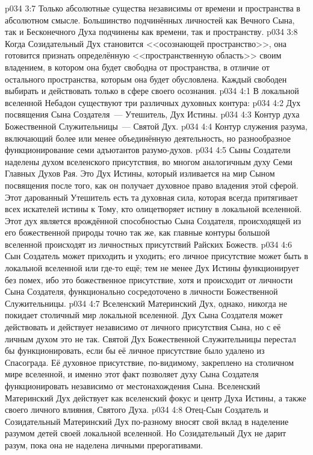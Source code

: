 \vs p034 3:7 \pc Только абсолютные существа независимы от времени и пространства в абсолютном смысле. Большинство подчинённых личностей как Вечного Сына, так и Бесконечного Духа подчинены как времени, так и пространству.
\vs p034 3:8 Когда Созидательный Дух становится <<осознающей пространство>>, она готовится признать определённую <<пространственную область>> своим владением, в котором она будет свободна от пространства, в отличие от остального пространства, которым она будет обусловлена. Каждый свободен выбирать и действовать только в сфере своего осознания.
\vs p034 4:1 В локальной вселенной Небадон существуют три различных духовных контура:
\vs p034 4:2 Дух посвящения Сына Создателя~--- Утешитель, Дух Истины.
\vs p034 4:3 Контур духа Божественной Служительницы~--- Святой Дух.
\vs p034 4:4 Контур служения разума, включающий более или менее объединённую деятельность, но разнообразное функционирование семи адъютантов разумо\hyp{}духов.
\vs p034 4:5 \pc Сыны Создатели наделены духом вселенского присутствия, во многом аналогичным духу Семи Главных Духов Рая. Это Дух Истины, который изливается на мир Сыном посвящения после того, как он получает духовное право владения этой сферой. Этот дарованный Утешитель есть та духовная сила, которая всегда притягивает всех искателей истины к Тому, кто олицетворяет истину в локальной вселенной. Этот дух является врождённой способностью Сына Создателя, происходящей из его божественной природы точно так же, как главные контуры большой вселенной происходят из личностных присутствий Райских Божеств.
\vs p034 4:6 Сын Создатель может приходить и уходить; его личное присутствие может быть в локальной вселенной или где-то ещё; тем не менее Дух Истины функционирует без помех, ибо это божественное присутствие, хотя и происходит от личности Сына Создателя, функционально сосредоточено в личности Божественной Служительницы.
\vs p034 4:7 Вселенский Материнский Дух, однако, никогда не покидает столичный мир локальной вселенной. Дух Сына Создателя может действовать и действует независимо от личного присутствия Сына, но с её личным духом это не так. Святой Дух Божественной Служительницы перестал бы функционировать, если бы её личное присутствие было удалено из Спасограда. Её духовное присутствие, по\hyp{}видимому, закреплено на столичном мире вселенной, и именно этот факт позволяет духу Сына Создателя функционировать независимо от местонахождения Сына. Вселенский Материнский Дух действует как вселенский фокус и центр Духа Истины, а также своего личного влияния, Святого Духа.
\vs p034 4:8 \pc Отец-Сын Создатель и Созидательный Материнский Дух по\hyp{}разному вносят свой вклад в наделение разумом детей своей локальной вселенной. Но Созидательный Дух не дарит разум, пока она не наделена личными прерогативами.
